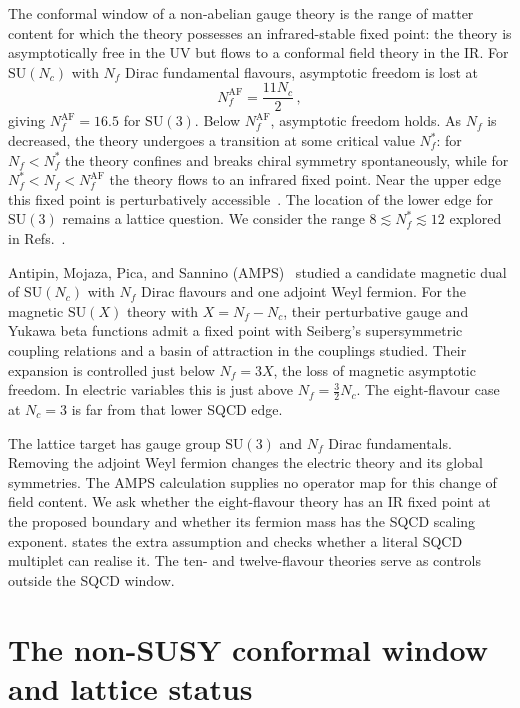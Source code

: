\documentclass[11pt,a4paper]{article}
\theoremstyle{plain}
\theoremstyle{definition}
\theoremstyle{remark}
\newcommand{\Nc}{N_{\!c}}
\newcommand{\Nf}{N_{\!f}}
\newcommand{\Nfstar}{\Nf^*}
\newcommand{\SU}[1]{\mathrm{SU}(#1)}
\newcommand{\AF}{\ensuremath{\mathrm{AF}}}
\begin{document}
The conformal window of a non-abelian gauge theory is the range of
matter content for which the theory possesses an infrared-stable fixed
point: the theory is asymptotically free in the UV but flows to a
conformal field theory in the IR.  For $\SU{\Nc}$ with $\Nf$ Dirac
fundamental flavours, asymptotic freedom is lost at
\begin{equation}\label{eq:AF-bound}
  \Nf^{\AF} = \frac{11\Nc}{2}\,,
\end{equation}
giving $\Nf^{\AF} = 16.5$ for $\SU{3}$.  Below $\Nf^{\AF}$, asymptotic
freedom holds.  As $\Nf$ is decreased, the theory undergoes a transition
at some critical value $\Nfstar$: for $\Nf < \Nfstar$ the theory
confines and breaks chiral symmetry spontaneously, while for
$\Nfstar < \Nf < \Nf^{\AF}$ the theory flows to an infrared fixed
point.  Near the upper edge this fixed point is perturbatively
accessible~\cite{BZ1982,Caswell1974}.  The location of the lower edge
for $\SU{3}$ remains a lattice question.  We consider the range
$8\lesssim\Nfstar\lesssim12$ explored in
Refs.~\cite{Hasenbusch2017,Appelquist2016,Aoki2014,Fodor2012}.

Antipin, Mojaza, Pica, and Sannino (AMPS)~\cite{AMPS2013} studied a
candidate magnetic dual of $\SU{\Nc}$ with $\Nf$ Dirac flavours and
one adjoint Weyl fermion.  For the magnetic $\SU{X}$ theory with
$X=\Nf-\Nc$, their perturbative gauge and Yukawa beta functions admit
a fixed point with Seiberg's supersymmetric coupling relations and a
basin of attraction in the couplings studied.  Their expansion is
controlled just below $\Nf=3X$, the loss of magnetic asymptotic
freedom.  In electric variables this is just above
$\Nf=\tfrac32\Nc$.  The eight-flavour case at $\Nc=3$ is far from
that lower SQCD edge.

The lattice target has gauge group $\SU{3}$ and $\Nf$ Dirac
fundamentals.  Removing the adjoint Weyl fermion changes the electric
theory and its global symmetries.  The AMPS calculation supplies no
operator map for this change of field content.  We ask whether the
eight-flavour theory has an IR fixed point at the proposed boundary
and whether its fermion mass has the SQCD scaling exponent.
 states the extra assumption and checks whether a
literal SQCD multiplet can realise it.  The ten- and twelve-flavour
theories serve as controls outside the SQCD window.


\section{The non-SUSY conformal window and lattice status}
\label{sec:review}
\end{document}
